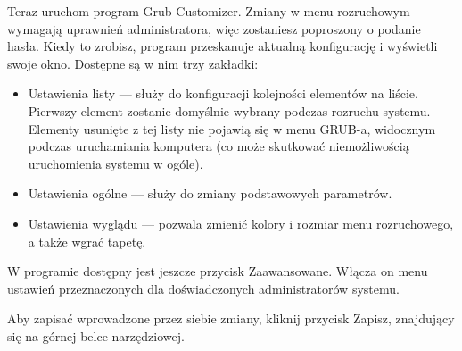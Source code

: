 Teraz uruchom program Grub Customizer. Zmiany w menu rozruchowym wymagają uprawnień administratora, więc zostaniesz poproszony o podanie hasła. Kiedy to zrobisz, program przeskanuje aktualną konfigurację i wyświetli swoje okno. Dostępne są w nim trzy zakładki:
\begin{itemize}
\item \textcolor{ubuntu_orange}{Ustawienia listy} --- służy do konfiguracji kolejności elementów na liście. Pierwszy element zostanie domyślnie wybrany podczas rozruchu systemu. Elementy usunięte z tej listy nie pojawią się w menu GRUB-a, widocznym podczas uruchamiania komputera (co może skutkować niemożliwością uruchomienia systemu w ogóle).
\item \textcolor{ubuntu_orange}{Ustawienia ogólne} --- służy do zmiany podstawowych parametrów.
\item \textcolor{ubuntu_orange}{Ustawienia wyglądu} --- pozwala zmienić kolory i rozmiar menu rozruchowego, a także wgrać tapetę.
\end{itemize}

W programie dostępny jest jeszcze przycisk \textcolor{ubuntu_orange}{Zaawansowane}. Włącza on menu ustawień przeznaczonych dla doświadczonych administratorów systemu.

Aby zapisać wprowadzone przez siebie zmiany, kliknij przycisk \textcolor{ubuntu_orange}{Zapisz}, znajdujący się na górnej belce narzędziowej.
